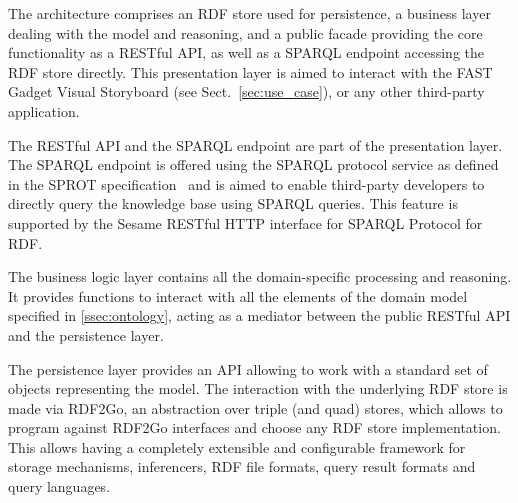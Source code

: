 The architecture comprises an RDF store used for persistence, a business layer dealing with the model and reasoning, and a public facade providing the core functionality as a RESTful API, as well as a SPARQL endpoint accessing the RDF store directly. This presentation layer is aimed to interact with the FAST Gadget Visual Storyboard (see Sect.~\ref{sec:use_case}), or any other third-party application.

The RESTful API and the SPARQL endpoint are part of the presentation layer. The SPARQL endpoint is offered using the SPARQL protocol service as defined in the SPROT specification~\cite{sprot} and is aimed to enable third-party developers to directly query the knowledge base using SPARQL queries. This feature is supported by the Sesame RESTful HTTP interface for SPARQL Protocol for RDF.

The business logic layer contains all the domain-specific processing and reasoning. It provides functions to interact with all the elements of the domain model specified in \ref{ssec:ontology},
acting as a mediator between the public RESTful API and the persistence layer.

The persistence layer provides an API allowing to work with a standard set of objects representing the model. The interaction with the underlying RDF store is made via RDF2Go, an abstraction over triple (and quad) stores, which allows to program against RDF2Go interfaces and choose any RDF store implementation. This allows having a completely extensible and configurable framework for storage mechanisms, inferencers, RDF file formats, query result formats and query languages.









